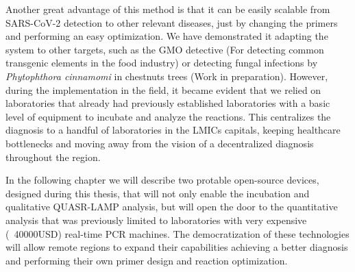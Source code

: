 Another great advantage of this method is that it can be easily scalable from SARS-CoV-2 detection to other relevant diseases, just by changing the primers and performing an easy optimization. We have demonstrated it adapting the system to other targets, such as the GMO detective (For detecting common transgenic elements in the food industry)\cite{guy_aidelberg_gmo_2018} or detecting fungal infections by \emph{Phytophthora cinnamomi} in chestnuts trees (Work in preparation). However, during the implementation in the field, it became evident that we relied on laboratories that already had previously established laboratories with a basic level of equipment to incubate and analyze the reactions. This centralizes the diagnosis to a handful of laboratories in the LMICs capitals, keeping healthcare bottlenecks and moving away from the vision of a decentralized diagnosis throughout the region.

In the following chapter we will describe two protable open-source devices, designed during this thesis, that will not only enable the incubation and qualitative QUASR-LAMP analysis, but will open the door to the quantitative analysis that was previously limited to laboratories with very expensive (~40000USD) real-time PCR machines. The democratization of these technologies will allow remote regions to expand their capabilities achieving a better diagnosis and performing their own primer design and reaction optimization.


